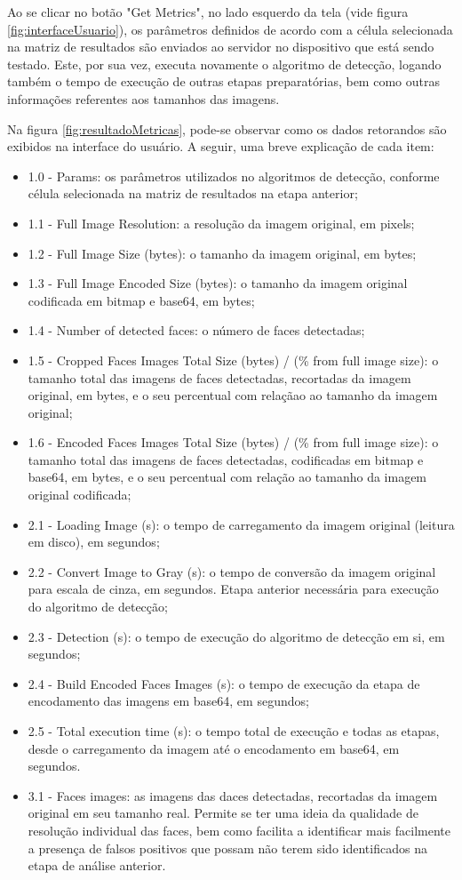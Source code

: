 Ao se clicar no botão "Get Metrics", no lado esquerdo da tela (vide figura \ref{fig:interfaceUsuario}), os parâmetros definidos de acordo com a célula selecionada na matriz de resultados são enviados ao servidor no dispositivo que está sendo testado. Este, por sua vez, executa novamente o algoritmo de detecção, logando também o tempo de execução de outras etapas preparatórias, bem como outras informações referentes aos tamanhos das imagens.

Na figura \ref{fig:resultadoMetricas}, pode-se observar como os dados retorandos são exibidos na interface do usuário. A seguir, uma breve explicação de cada item:

\begin{itemize}
    \item 1.0 - Params: os parâmetros utilizados no algoritmos de detecção, conforme célula selecionada na matriz de resultados na etapa anterior;
    \item 1.1 - Full Image Resolution: a resolução da imagem original, em pixels;
    \item 1.2 - Full Image Size (bytes): o tamanho da imagem original, em bytes;
    \item 1.3 - Full Image Encoded Size (bytes): o tamanho da imagem original codificada em bitmap e base64, em bytes;
    \item 1.4 - Number of detected faces: o número de faces detectadas;
    \item 1.5 - Cropped Faces Images Total Size (bytes) / (\% from full image size): o tamanho total das imagens de faces detectadas, recortadas da imagem original, em bytes, e o seu percentual com relaçãao ao tamanho da imagem original;
    \item 1.6 - Encoded Faces Images Total Size (bytes) / (\% from full image size): o tamanho total das imagens de faces detectadas, codificadas em bitmap e base64, em bytes, e o seu percentual com relação ao tamanho da imagem original codificada;
    \item 2.1 - Loading Image (s): o tempo de carregamento da imagem original (leitura em disco), em segundos;
    \item 2.2 - Convert Image to Gray (s): o tempo de conversão da imagem original para escala de cinza, em segundos. Etapa anterior necessária para execução do algoritmo de detecção;
    \item 2.3 - Detection (s): o tempo de execução do algoritmo de detecção em si, em segundos;
    \item 2.4 - Build Encoded Faces Images (s): o tempo de execução da etapa de encodamento das imagens em base64, em segundos;
    \item 2.5 - Total execution time (s): o tempo total de execução e todas as etapas, desde o carregamento da imagem até o encodamento em base64, em segundos.
    \item 3.1 - Faces images: as imagens das daces detectadas, recortadas da imagem original em seu tamanho real. Permite se ter uma ideia da qualidade de resolução individual das faces, bem como facilita a identificar mais facilmente a presença de falsos positivos que possam não terem sido identificados na etapa de análise anterior.
\end{itemize}

